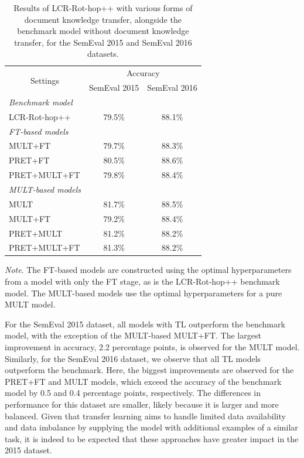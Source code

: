 \documentclass[runningheads]{llncs}
\begin{document}
\begin{table}[h]
\caption{Results of LCR-Rot-hop++ with various forms of document knowledge transfer, alongside the benchmark model without document knowledge transfer, for the SemEval 2015 and SemEval 2016 datasets.}
\label{tab:resultsModel}
\setlength{\tabcolsep}{38pt}
\begin{tabular}{@{}lcc@{}}
\toprule
\multicolumn{1}{c}{\multirow{2}{*}{Settings}} & \multicolumn{2}{c}{Accuracy} \\ \cmidrule(l){2-3} 
\multicolumn{1}{c}{}                          & SemEval 2015  & SemEval 2016 \\ \midrule
\textit{Benchmark model}                      &               &              \\
LCR-Rot-hop++                                 & 79.5\%        & 88.1\%       \\ \midrule
\textit{FT-based models}                      &               &              \\
MULT+FT                                       & 79.7\%        & 88.3\%       \\
PRET+FT                                       & 80.5\%        & 88.6\%       \\
PRET+MULT+FT                                  & 79.8\%         & 88.4\%       \\ \midrule
\textit{MULT-based models}                    &               &              \\
MULT                                          & 81.7\%        & 88.5\%       \\
MULT+FT                                       & 79.2\%        & 88.4\%       \\
PRET+MULT                                     & 81.2\%        & 88.2\%       \\
PRET+MULT+FT                                  & 81.3\%        & 88.2\%       \\ \bottomrule
\end{tabular}
\footnotesize\textit{Note}. The FT-based models are constructed using the optimal hyperparameters from a model with only the FT stage, as is the LCR-Rot-hop++ benchmark model. The MULT-based models use the optimal hyperparameters for a pure MULT model.
\vspace{-3mm}
\end{table}
For the SemEval 2015 dataset, all models with TL outperform the benchmark model, with the exception of the MULT-based MULT+FT. The largest improvement in accuracy, 2.2 percentage points, is observed for the MULT model. Similarly, for the SemEval 2016 dataset, we observe that all TL models outperform the benchmark. Here, the biggest improvements are observed for the PRET+FT and MULT models, which exceed the accuracy of the benchmark model by 0.5 and 0.4 percentage points, respectively. The differences in performance for this dataset are smaller, likely because it is larger and more balanced. Given that transfer learning aims to handle limited data availability and data imbalance by supplying the model with additional examples of a similar task, it is indeed to be expected that these approaches have greater impact in the 2015 dataset. 
\end{document}
